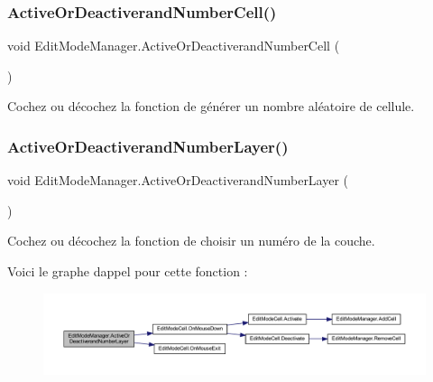 \subsubsection{\texorpdfstring{Active\+Or\+Deactiverand\+Number\+Cell()}{ActiveOrDeactiverandNumberCell()}}
{\footnotesize\ttfamily void Edit\+Mode\+Manager.\+Active\+Or\+Deactiverand\+Number\+Cell (\begin{DoxyParamCaption}{ }\end{DoxyParamCaption})\hspace{0.3cm}{\ttfamily [inline]}}



Cochez ou décochez la fonction de générer un nombre aléatoire de cellule. 

\mbox{\label{class_edit_mode_manager_ab1048ff448edf1c84b42abb9a811d0ae}} 
\subsubsection{\texorpdfstring{Active\+Or\+Deactiverand\+Number\+Layer()}{ActiveOrDeactiverandNumberLayer()}}
{\footnotesize\ttfamily void Edit\+Mode\+Manager.\+Active\+Or\+Deactiverand\+Number\+Layer (\begin{DoxyParamCaption}{ }\end{DoxyParamCaption})\hspace{0.3cm}{\ttfamily [inline]}}



Cochez ou décochez la fonction de choisir un numéro de la couche. 

Voici le graphe d\textquotesingle{}appel pour cette fonction \+:
\nopagebreak
\begin{figure}[H]
\begin{center}
\leavevmode
\includegraphics[width=350pt]{class_edit_mode_manager_ab1048ff448edf1c84b42abb9a811d0ae_cgraph}
\end{center}
\end{figure}
\mbox{\label{class_edit_mode_manager_a9f9fbe57f5bbb6b90dc1dc321d411c54}} 
